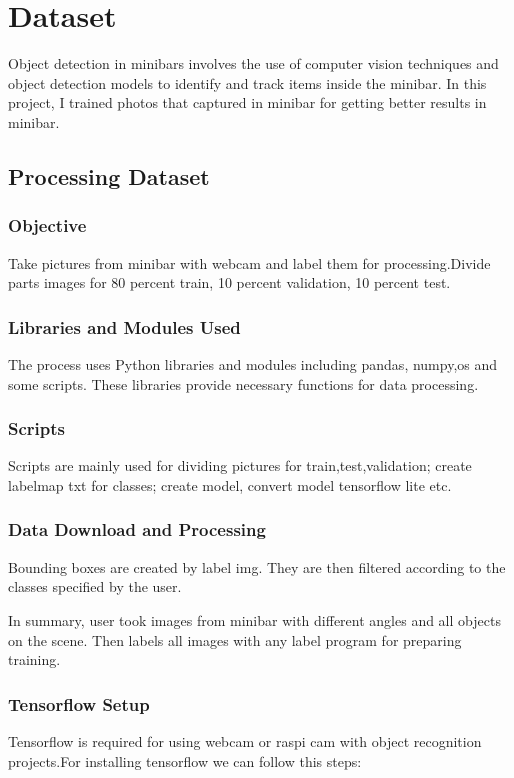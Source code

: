 \chapter{Dataset}

Object detection in minibars involves the use of computer vision techniques and object detection models to identify and track items inside the minibar. In this project, I trained photos that captured in minibar for getting better results in minibar.


\section{Processing Dataset}

\subsection{Objective}
Take pictures from minibar with webcam and label them for processing.Divide parts images for 80 percent train,
10 percent validation, 10 percent test.

\subsection{Libraries and Modules Used}
The process uses Python libraries and modules including pandas, numpy,os and some scripts. These libraries provide necessary functions for data processing.

\subsection{Scripts}
Scripts are mainly used for dividing pictures for train,test,validation; create labelmap txt for classes; create model, convert model tensorflow lite etc.

\subsection{Data Download and Processing}
Bounding boxes are created by label img. They are then filtered according to the classes specified by the user. 

In summary, user took images from minibar with different angles and all objects on the scene. Then labels all images with any label program for preparing training.

\subsection{Tensorflow Setup}
Tensorflow is required for using webcam or raspi cam with object recognition projects.For installing tensorflow we can follow this steps:

